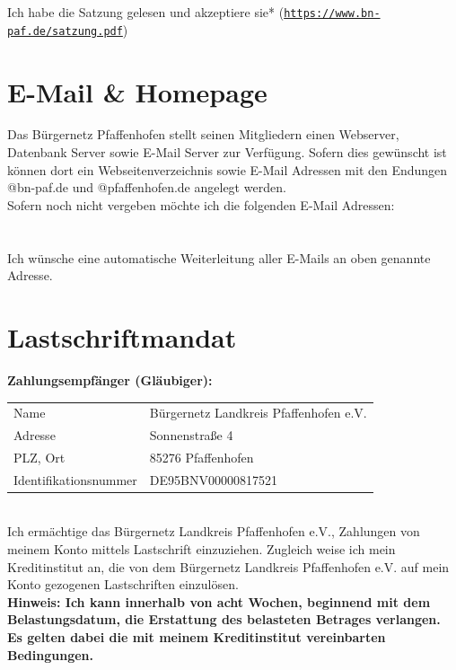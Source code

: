 \documentclass[a4paper,10pt]{article}
\newcommand{\UnderlinedField}[3][]{\TextField[name=#2,width=#3,bordercolor=black,borderstyle=U,#1]{}}
\begin{document}
\begin{Form}
\CheckBox[name=constitution,bordercolor=black,checkboxsymbol=\ding{54}]{ } Ich habe die Satzung gelesen und akzeptiere sie* (\href{https://www.bn-paf.de/satzung.pdf}{\texttt{https://www.bn-paf.de/satzung.pdf}})


\section*{E-Mail \& Homepage}

Das Bürgernetz Pfaffenhofen stellt seinen Mitgliedern einen Webserver, Datenbank Server sowie E-Mail Server zur Verfügung. Sofern dies gewünscht ist können dort ein Webseitenverzeichnis sowie E-Mail Adressen mit den Endungen @bn-paf.de und @pfaffenhofen.de angelegt werden.
\\
Sofern noch nicht vergeben möchte ich die folgenden E-Mail Adressen: \\
	\UnderlinedField{mailAddresses}{\textwidth} \\
\\
\CheckBox[name=forwardMails,bordercolor=black,checkboxsymbol=\ding{54}]{} Ich wünsche eine automatische Weiterleitung aller E-Mails an oben genannte Adresse.



\section*{Lastschriftmandat}
\fbox
{
	\begin{minipage}{\textwidth}
		\textbf{Zahlungsempfänger (Gläubiger):} \\
		\begin{tabular}{l l}
			Name					& Bürgernetz Landkreis Pfaffenhofen e.V. \\
			Adresse					& Sonnenstraße 4 \\
			PLZ, Ort				& 85276 Pfaffenhofen \\
			Identifikationsnummer	& DE95BNV00000817521 \\
		\end{tabular}
		\\

		Ich ermächtige das Bürgernetz Landkreis Pfaffenhofen e.V.,
		Zahlungen von meinem Konto mittels Lastschrift einzuziehen.
		Zugleich weise ich mein Kreditinstitut an, die von dem
		Bürgernetz Landkreis Pfaffenhofen e.V. auf mein Konto gezogenen
		Lastschriften einzulösen.
		\\
		
		\textbf{Hinweis: Ich kann innerhalb von acht Wochen, beginnend
		mit dem Belastungsdatum, die Erstattung des belasteten
		Betrages verlangen. Es gelten dabei die mit meinem
		Kreditinstitut vereinbarten Bedingungen.}
		\\
		

\end{minipage}}
\end{Form}
\end{document}
